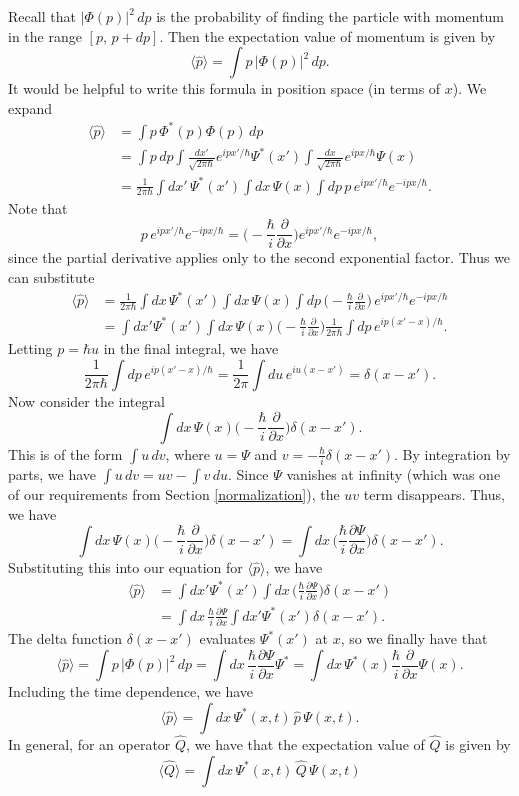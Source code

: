 Recall that $|\Phi(p)|^2\,dp$ is the probability of finding the particle with momentum in the range $[p,\,p+dp]$. Then the expectation value of momentum is given by $$\langle\hat{p}\rangle=\int p\,|\Phi(p)|^2\,dp.$$It would be helpful to write this formula in position space (in terms of $x$). We expand \begin{align*}\langle\hat{p}\rangle&=\int p\,\Phi^*(p)\Phi(p)\,dp\\&=\int p\,dp\int\frac{dx'}{\sqrt{2\pi\hbar}}e^{ipx'/\hbar}\Psi^*(x')\int\frac{dx}{\sqrt{2\pi\hbar}}e^{ipx/\hbar}\Psi(x)\\&=\frac{1}{2\pi\hbar}\int dx'\,\Psi^*(x')\int dx\,\Psi(x)\int dp\,p\,e^{ipx'/\hbar}e^{-ipx/\hbar}.\end{align*}Note that $$p\,e^{ipx'/\hbar}e^{-ipx/\hbar}=\bigg(-\frac{\hbar}{i}\frac{\partial}{\partial x}\bigg)e^{ipx'/\hbar}e^{-ipx/\hbar},$$since the partial derivative applies only to the second exponential factor. Thus we can substitute \begin{align*}\langle\hat{p}\rangle&=\frac{1}{2\pi\hbar}\int dx\,\Psi^*(x')\int dx\,\Psi(x)\int dp\,\bigg(-\frac{\hbar}{i}\frac{\partial}{\partial x}\bigg)\,e^{ipx'/\hbar}e^{-ipx/\hbar}\\&=\int dx'\Psi^*(x')\int dx\,\Psi(x)\bigg(-\frac{\hbar}{i}\frac{\partial}{\partial x}\bigg)\frac{1}{2\pi\hbar}\int dp\,e^{ip(x'-x)/\hbar}.\end{align*}Letting $p=\hbar u$ in the final integral, we have $$\frac{1}{2\pi\hbar}\int dp\,e^{ip(x'-x)/\hbar}=\frac{1}{2\pi}\int du\,e^{iu(x-x')}=\delta(x-x').$$Now consider the integral $$\int dx\,\Psi(x)\bigg(-\frac{\hbar}{i}\frac{\partial}{\partial x}\bigg)\delta(x-x').$$This is of the form $\int u\,dv$, where $u=\Psi$ and $v=-\frac{\hbar}{i}\delta(x-x')$. By integration by parts, we have $\int u\,dv=uv-\int v\,du$. Since $\Psi$ vanishes at infinity (which was one of our requirements from Section \ref{normalization}), the $uv$ term disappears. Thus, we have $$\int dx\,\Psi(x)\bigg(-\frac{\hbar}{i}\frac{\partial}{\partial x}\bigg)\delta(x-x')=\int dx\,\bigg(\frac{\hbar}{i}\frac{\partial\Psi}{\partial x}\bigg)\delta(x-x').$$Substituting this into our equation for $\langle\hat{p}\rangle$, we have \begin{align*}\langle\hat{p}\rangle&=\int dx'\Psi^*(x')\int dx\,\bigg(\frac{\hbar}{i}\frac{\partial\Psi}{\partial x}\bigg)\delta(x-x')\\&=\int dx\,\frac{\hbar}{i}\frac{\partial\Psi}{\partial x}\int dx'\Psi^*(x')\delta(x-x').\end{align*}The delta function $\delta(x-x')$ evaluates $\Psi^*(x')$ at $x$, so we finally have that $$\langle\hat{p}\rangle=\int p\,|\Phi(p)|^2\,dp=\int dx\,\frac{\hbar}{i}\frac{\partial\Psi}{\partial x}\Psi^*=\int dx\,\Psi^*(x)\frac{\hbar}{i}\frac{\partial}{\partial x}\Psi(x).$$Including the time dependence, we have $$\langle\hat{p}\rangle=\int dx\,\Psi^*(x,t)\,\hat{p}\,\Psi(x,t).$$In general, for an operator $\hat{Q}$, we have that the expectation value of $\hat{Q}$ is given by $$\boxed{\langle\hat{Q}\rangle=\int dx\,\Psi^*(x,t)\,\hat{Q}\,\Psi(x,t)}$$

